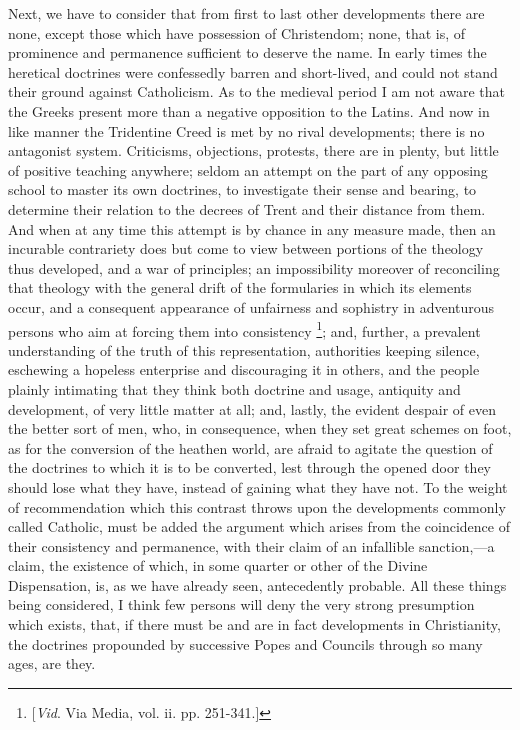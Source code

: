 Next, we have to consider that from first to last
other developments there are none, except those which
have possession of Christendom; none, that is, of
prominence and permanence sufficient to deserve the name.
In early times the heretical doctrines were confessedly
barren and short-lived, and could not stand their ground
against Catholicism. As to the medieval period I am not
aware that the Greeks present more than a negative
opposition to the Latins. And now in like manner the
Tridentine Creed is met by no rival developments; there
is no antagonist system. Criticisms, objections,
protests, there are in plenty, but little of positive
teaching anywhere; seldom an attempt on the part of any
opposing school to master its own doctrines, to
investigate their sense and bearing, to determine their
relation to the decrees of Trent and their distance from
them. And when at any time this attempt is by chance in
any measure made, then an incurable contrariety does but
come to view between portions of the theology thus
developed, and a war of principles; an impossibility
moreover of reconciling that theology with the general
drift of the formularies in which its elements occur, and
a consequent appearance of unfairness and sophistry in
adventurous persons who aim at forcing them into
consistency \footnote{[\emph{Vid}. Via
Media, vol.
ii. pp. 251-341.]}; and, further, a prevalent understanding of the
truth of this representation, authorities keeping
silence, eschewing a hopeless enterprise and discouraging
it in others, and the people plainly intimating that they
think both doctrine and usage, antiquity and development,
of very little matter at all; and, lastly, the evident
despair of even the better sort of men, who, in
consequence, when they set great schemes on foot, as for
the conversion of the heathen world, are afraid to
agitate the question of the doctrines to which it is to
be converted, lest through the opened door they should
lose what they have, instead of gaining what they have
not. To the weight of recommendation which this contrast
throws upon the developments commonly called Catholic,
must be added the argument which arises from the
coincidence of their consistency and permanence, with
their claim of an infallible sanction,—a claim, the
existence of which, in some quarter or other of the
Divine Dispensation, is, as we have already seen,
antecedently probable. All these things being considered,
I think few persons will deny the very strong presumption
which exists, that, if there must be and are in fact
developments in Christianity, the doctrines propounded by
successive Popes and Councils through so many ages, are
they.

